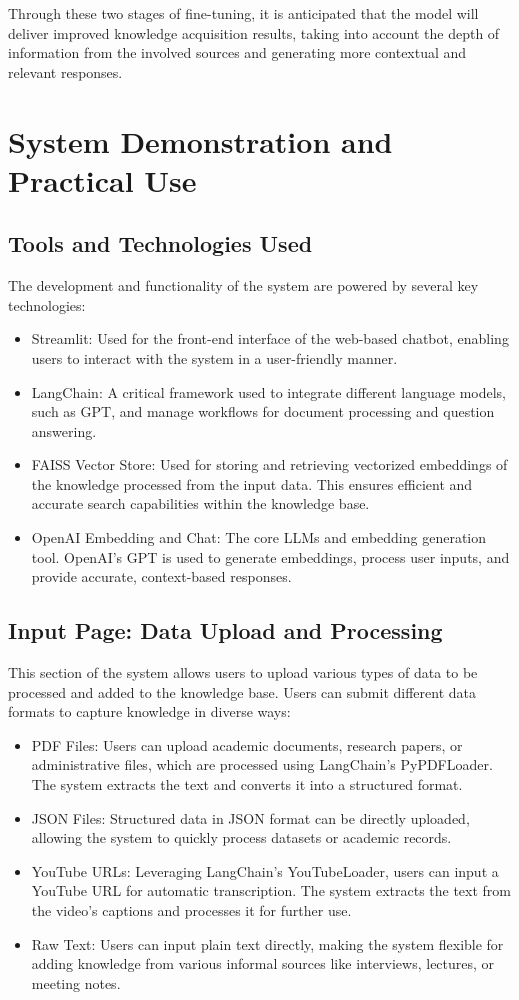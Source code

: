 \documentclass[runningheads]{llncs}
\begin{document}
Through these two stages of fine-tuning, it is anticipated that the model will deliver improved knowledge acquisition results, taking into account the depth of information from the involved sources and generating more contextual and relevant responses.


\section{System Demonstration and Practical Use}
\subsection{Tools and Technologies Used}
The development and functionality of the system are powered by several key technologies:
\begin{itemize}
    \item Streamlit: Used for the front-end interface of the web-based chatbot, enabling users to interact with the system in a user-friendly manner.
    \item LangChain: A critical framework used to integrate different language models, such as GPT, and manage workflows for document processing and question answering.
    \item FAISS Vector Store: Used for storing and retrieving vectorized embeddings of the knowledge processed from the input data. This ensures efficient and accurate search capabilities within the knowledge base.
    \item OpenAI Embedding and Chat: The core LLMs and embedding generation tool. OpenAI's GPT is used to generate embeddings, process user inputs, and provide accurate, context-based responses.
\end{itemize}

\subsection{Input Page: Data Upload and Processing}
This section of the system allows users to upload various types of data to be processed and added to the knowledge base. Users can submit different data formats to capture knowledge in diverse ways:
\begin{itemize}
    \item PDF Files: Users can upload academic documents, research papers, or administrative files, which are processed using LangChain's PyPDFLoader. The system extracts the text and converts it into a structured format.
    \item JSON Files: Structured data in JSON format can be directly uploaded, allowing the system to quickly process datasets or academic records.
    \item YouTube URLs: Leveraging LangChain's YouTubeLoader, users can input a YouTube URL for automatic transcription. The system extracts the text from the video's captions and processes it for further use.
    \item Raw Text: Users can input plain text directly, making the system flexible for adding knowledge from various informal sources like interviews, lectures, or meeting notes.
\end{itemize}
\end{document}
